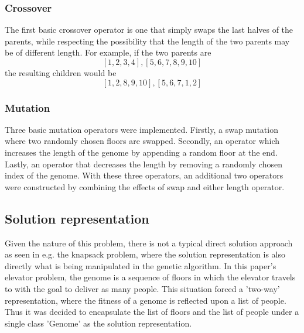 \subsubsection{Crossover}

	The first basic crossover operator is one that simply swaps the last halves of the parents, while respecting the possibility that the length of the two parents may be of different length. For example, if the two parents are $$ [1, 2, 3, 4], [5, 6, 7, 8, 9, 10] $$ the resulting children would be $$ [1, 2, 8, 9, 10], [5, 6, 7, 1, 2] $$

\subsubsection{Mutation}

	Three basic mutation operators were implemented. Firstly, a swap mutation where two randomly chosen floors are swapped. Secondly, an operator which increases the length of the genome by appending a random floor at the end. Lastly, an operator that decreases the length by removing a randomly chosen index of the genome. With these three operators, an additional two operators were constructed by combining the effects of swap and either length operator.


\subsection{Solution representation}

    Given the nature of this problem, there is not a typical direct solution approach as seen in e.g. the knapsack problem, where the solution representation is also directly what is being manipulated in the genetic algorithm. In this paper's elevator problem, the genome is a sequence of floors in which the elevator travels to with the goal to deliver as many people. This situation forced a 'two-way' representation, where the fitness of a genome is reflected upon a list of people. Thus it was decided to encapsulate the list of floors and the list of people under a single class 'Genome' as the solution representation.

